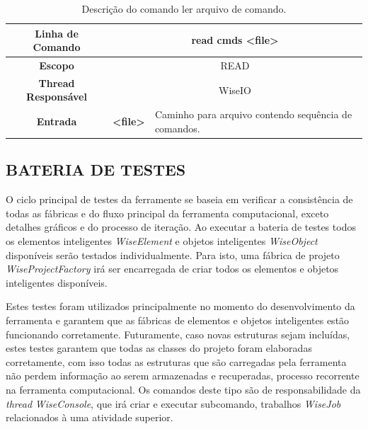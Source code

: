 \begin{center}
	\begin{table}[!htbp]
		\begin{tabularx}{\textwidth}{c|c|X}
			\toprule
			\textbf{Linha de Comando} & \multicolumn{2}{c}{read cmds <file>} \\
			\midrule
			\textbf{Escopo} & \multicolumn{2}{c}{READ} \\
			\hline
			\textbf{Thread Responsável} & \multicolumn{2}{c}{WiseIO} \\
			\hline
			\textbf{Entrada} & \textbf{<file>} & Caminho para arquivo contendo sequência de comandos. \\
			\bottomrule
		\end{tabularx}
		\caption{Descrição do comando ler arquivo de comando.}
		\label{tab:read}
	\end{table}
\end{center}

\subsection{BATERIA DE TESTES}\label{sec:test}

O ciclo principal de testes da ferramente se baseia em verificar a consistência de todas as fábricas e do fluxo principal da ferramenta computacional, exceto detalhes gráficos e do processo de iteração. Ao executar a bateria de testes todos os elementos inteligentes \textit{WiseElement} e objetos inteligentes \textit{WiseObject} disponíveis serão testados individualmente. Para isto, uma fábrica de projeto \textit{WiseProjectFactory} irá ser encarregada de criar todos os elementos e objetos inteligentes disponíveis.

Estes testes foram utilizados principalmente no momento do desenvolvimento da ferramenta e garantem que as fábricas de elementos e objetos inteligentes estão funcionando corretamente. Futuramente, caso novas estruturas sejam incluídas, estes testes garantem que todas as classes do projeto foram elaboradas corretamente, com isso todas as estruturas que são carregadas pela ferramenta não perdem informação ao serem armazenadas e recuperadas, processo recorrente na ferramenta computacional. Os comandos deste tipo são de responsabilidade da \textit{thread} \textit{WiseConsole}, que irá criar e executar subcomando, trabalhos \textit{WiseJob} relacionados à uma atividade superior.


